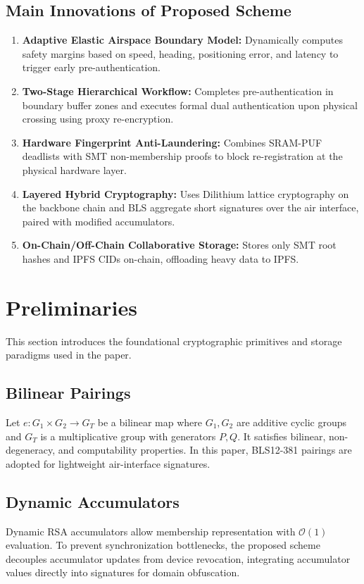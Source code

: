 \documentclass[lettersize,journal]{IEEEtran}
\begin{document}
\subsection{Main Innovations of Proposed Scheme}
\begin{enumerate}
    \item \textbf{Adaptive Elastic Airspace Boundary Model:} Dynamically computes safety margins based on speed, heading, positioning error, and latency to trigger early pre-authentication.
    \item \textbf{Two-Stage Hierarchical Workflow:} Completes pre-authentication in boundary buffer zones and executes formal dual authentication upon physical crossing using proxy re-encryption.
    \item \textbf{Hardware Fingerprint Anti-Laundering:} Combines SRAM-PUF deadlists with SMT non-membership proofs to block re-registration at the physical hardware layer.
    \item \textbf{Layered Hybrid Cryptography:} Uses Dilithium lattice cryptography on the backbone chain and BLS aggregate short signatures over the air interface, paired with modified accumulators.
    \item \textbf{On-Chain/Off-Chain Collaborative Storage:} Stores only SMT root hashes and IPFS CIDs on-chain, offloading heavy data to IPFS.
\end{enumerate}
\section{Preliminaries}
This section introduces the foundational cryptographic primitives and storage paradigms used in the paper.
\subsection{Bilinear Pairings}
Let $e: G_1 \times G_2 \longrightarrow G_T$ be a bilinear map where $G_1, G_2$ are additive cyclic groups and $G_T$ is a multiplicative group with generators $P, Q$. It satisfies bilinear, non-degeneracy, and computability properties. In this paper, BLS12-381 pairings are adopted for lightweight air-interface signatures.
\subsection{Dynamic Accumulators}
Dynamic RSA accumulators allow membership representation with $\mathcal{O}(1)$ evaluation. To prevent synchronization bottlenecks, the proposed scheme decouples accumulator updates from device revocation, integrating accumulator values directly into signatures for domain obfuscation.
\end{document}
